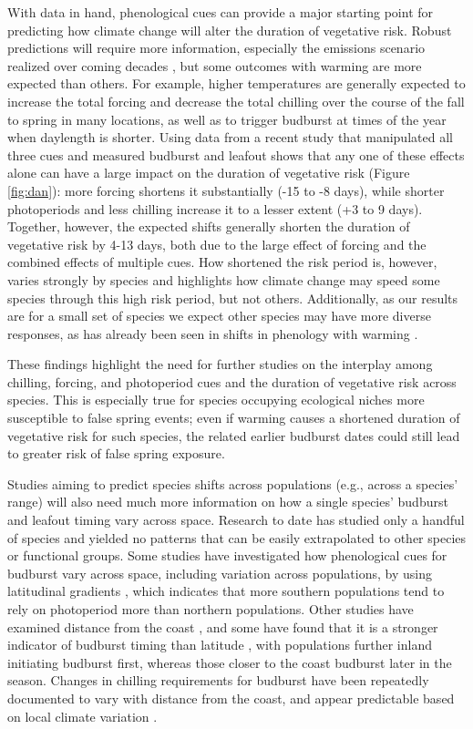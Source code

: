 \documentclass{article}\usepackage[]{graphicx}\usepackage[]{color}
\begin{document}
With data in hand, phenological cues can provide a major starting point for predicting how climate change will alter the duration of vegetative risk. Robust predictions will require more information, especially the emissions scenario realized over coming decades \citep{IPCC2014}, but some outcomes with warming are more expected than others. For example, higher temperatures are generally expected to increase the total forcing and decrease the total chilling over the course of the fall to spring in many locations, as well as to trigger budburst at times of the year when daylength is shorter. Using data from a recent study that manipulated all three cues and measured budburst and leafout \citep{Flynn2018} shows that any one of these effects alone can have a large impact on the duration of vegetative risk (Figure \ref{fig:dan}): more forcing shortens it substantially (-15 to -8 days), while shorter photoperiods and less chilling increase it to a lesser extent (+3 to 9 days). Together, however, the expected shifts generally shorten the duration of vegetative risk by 4-13 days, both due to the large effect of forcing and the combined effects of multiple cues. How shortened the risk period is, however, varies strongly by species and highlights how climate change may speed some species through this high risk period, but not others. Additionally, as our results are for a small set of species we expect other species may have more diverse responses, as has already been seen in shifts in phenology with warming \citep{Cleland2006, Fu2015, Xin2016}.

These findings highlight the need for further studies on the interplay among chilling, forcing, and photoperiod cues and the duration of vegetative risk across species. This is especially true for species occupying ecological niches more susceptible to false spring events; even if warming causes a shortened duration of vegetative risk for such species, the related earlier budburst dates could still lead to greater risk of false spring exposure.

Studies aiming to predict species shifts across populations (e.g., across a species' range) will also need much more information on how a single species' budburst and leafout timing vary across space. Research to date has studied only a handful of species and yielded no patterns that can be easily extrapolated to other species or functional groups. Some studies have investigated how phenological cues for budburst vary across space, including variation across populations, by using latitudinal gradients \citep{Gauzere2017, Sogaard2008, Way2015, Zohner2016}, which indicates that more southern populations tend to rely on photoperiod more than northern populations. Other studies have examined distance from the coast \citep[see][]{Aitken2015, Harrington2015, Myking2007}, and some have found that it is a stronger indicator of budburst timing than latitude \citep{Myking2007}, with populations further inland initiating budburst first, whereas those closer to the coast budburst later in the season. Changes in chilling requirements for budburst have been repeatedly documented to vary with distance from the coast, and appear predictable based on local climate variation \citep{Campbell1979, Howe2003}.  
\end{document}
